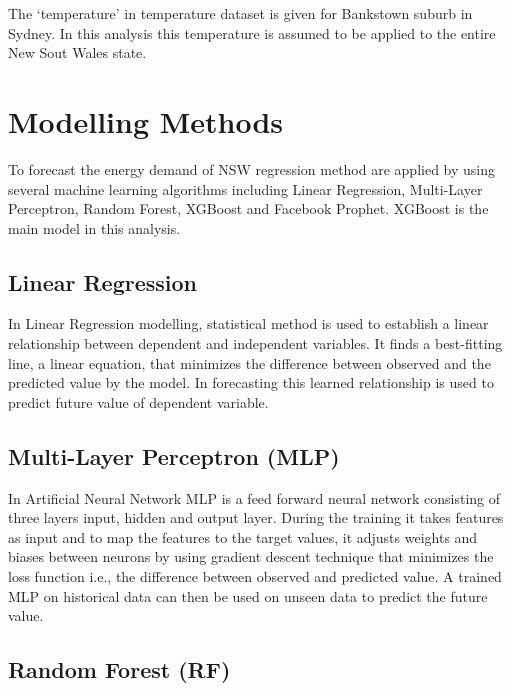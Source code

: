 \documentclass[mstat,12pt]{unswthesis}
\begin{document}
The `temperature' in temperature dataset is given for Bankstown suburb
in Sydney. In this analysis this temperature is assumed to be applied to
the entire New Sout Wales state.

\hypertarget{modelling-methods}{%
\section{Modelling Methods}\label{modelling-methods}}

To forecast the energy demand of NSW regression method are applied by
using several machine learning algorithms including Linear Regression,
Multi-Layer Perceptron, Random Forest, XGBoost and Facebook Prophet.
XGBoost is the main model in this analysis.

\hypertarget{linear-regression}{%
\subsection{Linear Regression}\label{linear-regression}}

In Linear Regression modelling, statistical method is used to establish
a linear relationship between dependent and independent variables. It
finds a best-fitting line, a linear equation, that minimizes the
difference between observed and the predicted value by the model. In
forecasting this learned relationship is used to predict future value of
dependent variable.

\hypertarget{multi-layer-perceptron-mlp}{%
\subsection{Multi-Layer Perceptron
(MLP)}\label{multi-layer-perceptron-mlp}}

In Artificial Neural Network MLP is a feed forward neural network
consisting of three layers input, hidden and output layer. During the
training it takes features as input and to map the features to the
target values, it adjusts weights and biases between neurons by using
gradient descent technique that minimizes the loss function i.e., the
difference between observed and predicted value. A trained MLP on
historical data can then be used on unseen data to predict the future
value.

\hypertarget{random-forest-rf}{%
\subsection{Random Forest (RF)}\label{random-forest-rf}}
\end{document}
